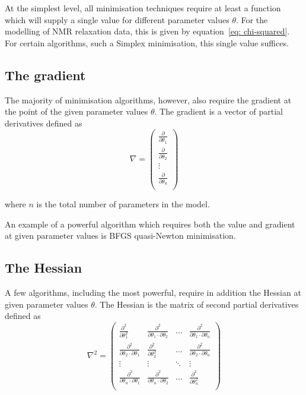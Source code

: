 At the simplest level, all minimisation techniques require at least a function which will supply a single value for different parameter values $\theta$.  For the modelling of NMR relaxation data, this is given by equation~\eqref{eq: chi-squared}.  For certain algorithms, such a Simplex minimisation, this single value suffices.


\subsection{The gradient}

The majority of minimisation algorithms, however, also require the gradient at the point of the given parameter values $\theta$.  The gradient is a vector of partial derivatives defined as
\begin{equation}
 \nabla = \begin{pmatrix}
  \frac{\partial}{\partial \theta_1} \\
  \frac{\partial}{\partial \theta_2} \\
  \vdots \\
  \frac{\partial}{\partial \theta_n} \\
 \end{pmatrix}
\end{equation}

\noindent where $n$ is the total number of parameters in the model.

An example of a powerful algorithm which requires both the value and gradient at given parameter values is BFGS quasi-Newton minimisation.


\subsection{The Hessian}

A few algorithms, including the most powerful, require in addition the Hessian at given parameter values $\theta$.  The Hessian is the matrix of second partial derivatives defined as
\begin{equation}
 \nabla^2 = \begin{pmatrix}
  \frac{\partial^2}{\partial \theta_1^2}                       & \frac{\partial^2}{\partial \theta_1 \cdot \partial \theta_2}  & \ldots    & \frac{\partial^2}{\partial \theta_1 \cdot \partial \theta_n} \\
  \frac{\partial^2}{\partial \theta_2 \cdot \partial \theta_1} & \frac{\partial^2}{\partial \theta_2^2}                        & \ldots    & \frac{\partial^2}{\partial \theta_2 \cdot \partial \theta_n} \\
  \vdots                                                       & \vdots                                                        & \ddots    & \vdots \\
  \frac{\partial^2}{\partial \theta_n \cdot \partial \theta_1} & \frac{\partial^2}{\partial \theta_n \cdot \partial \theta_2}  & \ldots    & \frac{\partial^2}{\partial \theta_n^2} \\
 \end{pmatrix}
\end{equation}

